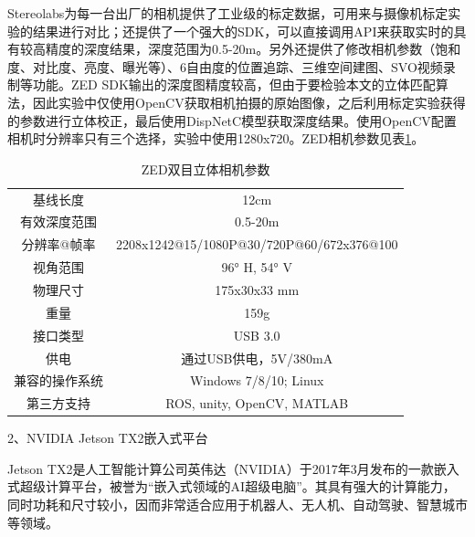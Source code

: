 Stereolabs为每一台出厂的相机提供了工业级的标定数据，可用来与摄像机标定实验的结果进行对比；还提供了一个强大的SDK，可以直接调用API来获取实时的具有较高精度的深度结果，深度范围为0.5-20m。另外还提供了修改相机参数（饱和度、对比度、亮度、曝光等）、6自由度的位置追踪、三维空间建图、SVO视频录制等功能。ZED SDK输出的深度图精度较高，但由于要检验本文的立体匹配算法，因此实验中仅使用OpenCV获取相机拍摄的原始图像，之后利用标定实验获得的参数进行立体校正，最后使用DispNetC模型获取深度结果。使用OpenCV配置相机时分辨率只有三个选择，实验中使用1280x720。ZED相机参数见表\ref{tab:5_ZED}。

\begin{table}[htb] %
	\centering
	\caption{ZED双目立体相机参数}
	\label{tab:5_ZED}
	\begin{small}
	\begin{tabular*}{\textwidth}{@{\extracolsep{\fill}}cc} \toprule[2pt]
		基线长度 & 12cm \\
		有效深度范围   & 0.5-20m \\
		分辨率@帧率 & 2208x1242@15/1080P@30/720P@60/672x376@100 \\
		视角范围 & 96° H, 54° V \\
		物理尺寸 & 175x30x33 mm \\
		重量 & 159g \\
		接口类型 & USB 3.0 \\
		供电 & 通过USB供电，5V/380mA \\
		兼容的操作系统 & Windows 7/8/10; Linux \\
		第三方支持 & ROS, unity, OpenCV, MATLAB \\ \bottomrule[2pt]
	\end{tabular*}
	\end{small}
\end{table}

2、NVIDIA Jetson TX2嵌入式平台

Jetson TX2是人工智能计算公司英伟达（NVIDIA）于2017年3月发布的一款嵌入式超级计算平台，被誉为“嵌入式领域的AI超级电脑”。其具有强大的计算能力，同时功耗和尺寸较小，因而非常适合应用于机器人、无人机、自动驾驶、智慧城市等领域。

